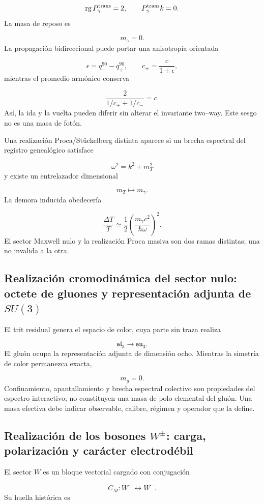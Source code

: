 \[
 \operatorname{rg}P_\gamma^{\rm trans}=2,
\qquad
 P_\gamma^{\rm trans}k=0.
\]
La masa de reposo es

\[
 m_\gamma=0.
\]
La propagación bidireccional puede portar una anisotropía orientada

\[
 \epsilon=q_-^{90}-q_+^{90},
\qquad
 c_\pm=\frac{c}{1\pm\epsilon},
\]
mientras el promedio armónico conserva

\[
 \frac{2}{1/c_++1/c_-}=c.
\]
Así, la ida y la vuelta pueden diferir sin alterar el invariante two--way. Este sesgo no es una masa de fotón.

Una realización Proca/Stückelberg distinta aparece si un brecha espectral del registro genealógico satisface

\[
 \omega^2=k^2+m_T^2
\]
y existe un entrelazador dimensional

\[
 m_T\longmapsto m_\gamma.
\]
La demora inducida obedecería

\[
 \frac{\Delta T}{T}
 \simeq\frac12
 \left(\frac{m_\gamma c^2}{\hbar\omega}\right)^2.
\]
El sector Maxwell nulo y la realización Proca masiva son dos ramas distintas; una no invalida a la otra.

\subsection{Realización cromodinámica del sector nulo: octete de gluones y representación adjunta de \(SU(3)\)}
El trit residual genera el espacio de color, cuya parte sin traza realiza

\[
 \mathfrak{sl}_3\longrightarrow\mathfrak{su}_3.
\]
El gluón ocupa la representación adjunta de dimensión ocho. Mientras la simetría de color permanezca exacta,

\[
 m_g=0.
\]
Confinamiento, apantallamiento y brecha espectral colectivo son propiedades del espectro interactivo; no constituyen una masa de polo elemental del gluón. Una masa efectiva debe indicar observable, calibre, régimen y operador que la define.

\subsection{Realización de los bosones \(W^\pm\): carga, polarización y carácter electrodébil}
El sector \(W\) es un bloque vectorial cargado con conjugación

\[
 C_M:W^+\longleftrightarrow W^-.
\]
Su huella histórica es

